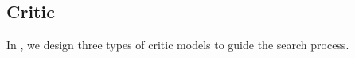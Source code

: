 \subsection{Critic}
\label{sec:critic}

In \model{}, we design three types of critic models to guide the search process.


